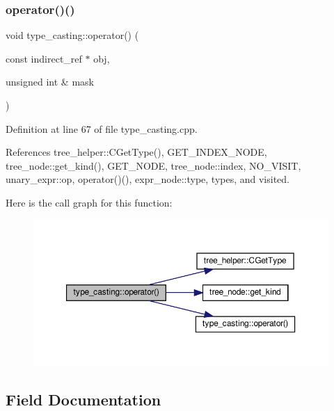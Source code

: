 \subsubsection{\texorpdfstring{operator()()}{operator()()}\hspace{0.1cm}{\footnotesize\ttfamily [2/2]}}
{\footnotesize\ttfamily void type\+\_\+casting\+::operator() (\begin{DoxyParamCaption}\item[{const indirect\+\_\+ref $\ast$}]{obj,  }\item[{unsigned int \&}]{mask }\end{DoxyParamCaption})\hspace{0.3cm}{\ttfamily [override]}}



Definition at line 67 of file type\+\_\+casting.\+cpp.



References tree\+\_\+helper\+::\+C\+Get\+Type(), G\+E\+T\+\_\+\+I\+N\+D\+E\+X\+\_\+\+N\+O\+DE, tree\+\_\+node\+::get\+\_\+kind(), G\+E\+T\+\_\+\+N\+O\+DE, tree\+\_\+node\+::index, N\+O\+\_\+\+V\+I\+S\+IT, unary\+\_\+expr\+::op, operator()(), expr\+\_\+node\+::type, types, and visited.

Here is the call graph for this function\+:
\nopagebreak
\begin{figure}[H]
\begin{center}
\leavevmode
\includegraphics[width=350pt]{dd/d6d/structtype__casting_a463829f253347a18a6275a5c15b40ebf_cgraph}
\end{center}
\end{figure}


\subsection{Field Documentation}
\mbox{\label{structtype__casting_a29c7e1c62a1db476fa29340fb61f6722}} 
